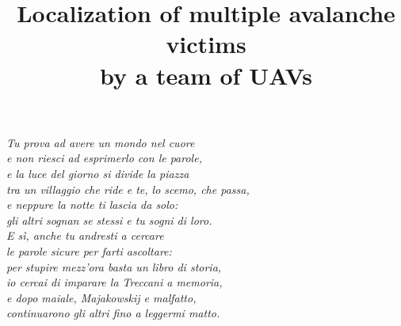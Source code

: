 \documentclass[12pt,a4paper,oneside]{article}
\title{Localization of multiple avalanche victims 
\\[6pt]
by a team of UAVs}
\author{}
\date{}             %
\theoremstyle{definition}
\begin{document}

\clearpage
\thispagestyle{empty} %
\vspace*{\fill}
\hspace*{\fill} %
\begin{minipage}{0.6\textwidth} %
    \raggedleft 
    \itshape 
    Tu prova ad avere un mondo nel cuore\\
    e non riesci ad esprimerlo con le parole,\\
    e la luce del giorno si divide la piazza\\
    tra un villaggio che ride e te, lo scemo, che passa,\\
    e neppure la notte ti lascia da solo:\\ 
    gli altri sognan se stessi e tu sogni di loro.\\
    \vspace{3\baselineskip} 
    E sì, anche tu andresti a cercare\\
    le parole sicure per farti ascoltare:\\
    per stupire mezz’ora basta un libro di storia,\\
    io cercai di imparare la Treccani a memoria,\\
    e dopo maiale, Majakowskij e malfatto,\\
    continuarono gli altri fino a leggermi matto.
\end{minipage}
\vspace*{\fill}

\clearpage
\tableofcontents
\clearpage

\clearpage

\clearpage

\clearpage

\clearpage

\clearpage

\clearpage


\clearpage
\printbibliography 
\nocite{*}  %

\clearpage

\clearpage
\end{document}
